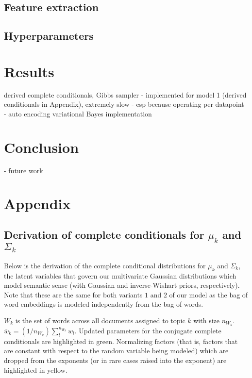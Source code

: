 \documentclass[12pt]{article}
\begin{document}
\subsection{Feature extraction}

\subsection{Hyperparameters}

\section{Results}

 derived complete conditionals, Gibbs sampler
				- implemented for model 1 (derived conditionals in Appendix), extremely slow
					- esp because operating per datapoint
			- auto encoding variational Bayes implementation

\section{Conclusion}

- future work

\pagebreak

\section{Appendix}

\subsection{Derivation of complete conditionals for $\mu_k$ and $\Sigma_k$}

Below is the derivation of the complete conditional distributions for $\mu_k$ and $\Sigma_k$, the latent variables that govern our multivariate Gaussian distributions which model semantic sense (with Gaussian and inverse-Wishart priors, respectively).  Note that these are the same for both variants $1$ and $2$ of our model as the bag of word embeddings is modeled independently from the bag of words.

$W_k$ is the set of words across all documents assigned to topic $k$ with size $n_{W_k}$.  $\bar{w}_k = (1/n_{W_k})\sum^{n_{W_k}}_l w_l$.  Updated parameters for the conjugate complete conditionals are highlighted in green.  Normalizing factors (that is, factors that are constant with respect to the random variable being modeled) which are dropped from the exponents (or in rare cases raised into the exponent) are highlighted in yellow.
\end{document}

